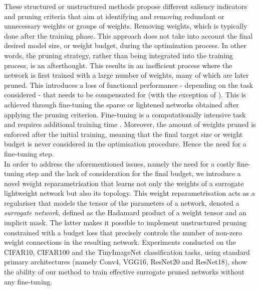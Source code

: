 These structured or unstructured methods propose different saliency indicators
and pruning criteria that aim at identifying and removing redundant or
unnecessary weights or groups of weights. Removing weights, which is typically
done after the training phase. This approach does not take into account the
final desired model size, or weight budget, during the optimization process. In
other words, the pruning strategy, rather than being integrated into the
training process, is an afterthought. This results in an inefficient process
where the network is first trained with a large number of weights, many of which
are later pruned. This introduces a loss of functional performance - depending on
the task considered - that needs to be compensated for (with the exception of
\cite{DBLP:conf/icml/KangH20}). This is achieved through fine-tuning the sparse
or lightened networks obtained after applying the pruning criterion. Fine-tuning
is a computationally intensive task and requires additional training time
\cite{DBLP:conf/nips/HanPTD15,DBLP:journals/corr/HanMD15}. Moreover, the amount
of weights pruned is enforced after the initial training, meaning that the final
target size or weight budget is never considered in the optimisation procedure.
Hence the need for a fine-tuning step. \\


In order to address the aforementioned issues, namely the need for a costly
fine-tuning step and the lack of consideration for the final budget, we
introduce a novel weight reparametrisation that learns not only the weights of a
surrogate lightweight network but also its topology. This weight
reparametrisation acts as a regulariser that models the tensor of the parameters
of a network, denoted a \textit{surrogate network}, defined as the Hadamard
product of a weight tensor and an implicit mask. The latter makes it possible to
implement unstructured pruning constrained with a budget loss that precisely
controls the number of non-zero weight connections in the resulting network.
Experiments conducted on the CIFAR10, CIFAR100 and the TinyImageNet
classification tasks, using standard primary architectures (namely Conv4, VGG16,
ResNet20 and ResNet18), show the ability of our method to train effective
surrogate pruned networks without any fine-tuning.


